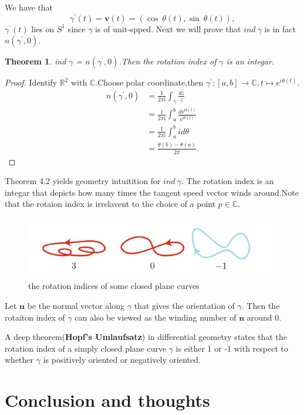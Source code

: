 \documentclass[11pt]{article}
\newtheorem{theorem}{Theorem}
\numberwithin{equation}{section} \numberwithin{theorem}{section}
\numberwithin{lemma}{section} \numberwithin{remark}{section}
\numberwithin{table}{section} \numberwithin{corollary}{section}
\numberwithin{example}{section} \numberwithin{conjecture}{section}
\numberwithin{assumption}{section}
\numberwithin{definition}{section}
\numberwithin{proposition}{section}
\begin{document}
We have that 
\begin{equation}
\gamma^{'}(t)=\mathbf{v}(t)=(\cos \ \theta(t),\sin\ \theta(t)),
\end{equation}
$\gamma^{'}(t)$ lies on $S^1$ since $\gamma$ is of unit-spped.
Next we will prove that $ind \ \gamma$ is in fact $n(\gamma^{'},0)$.
\begin{theorem}
ind  $\gamma$ = $n(\gamma^{'},0)$.Then the rotation index of $\gamma$ is an integar.
\end{theorem}
\begin{proof}
    Identify $\mathbb{R}^2$ with $\mathbb{C}$.Choose polar coordinate,then $\gamma^{'}:[a,b]\rightarrow \mathbb{C},t\mapsto e^{i\theta(t)}$.
    \begin{align*}
        n(\gamma^{'},0)&=\frac{1}{2\pi \mathrm{i}}\int_{\gamma}\frac{dz}{z}\\
        &=\frac{1}{2\pi \mathrm{i}}\int_{a}^b\frac{d\mathrm{e}^{\mathrm{i}\theta(t)}}{\mathrm{e}^{\mathrm{i}\theta(t)}}\\
        &=\frac{1}{2\pi \mathrm{i}}\int_{a}^b id\theta\\
        &=\frac{\theta(b)-\theta(a)}{2\pi}.
    \end{align*}
\end{proof} 
Theorem 4.2 yields geometry intuitition for $ind\  \gamma$. The rotation index is an integar that depicts how many times the tangent speed vector winds around.Note that the rotaion index is irrelavent to the choice of a point $p \in \mathbb{C}$.
\begin{figure}[H]
\includegraphics[width=11cm]{image/rotation index.PNG}
\centering
\caption{the rotation indices of some closed plane curves}
\end{figure}
Let $\mathbf{n}$ be the normal vector along $\gamma$ that gives the orientation of $\gamma$. Then the rotaiton index of $\gamma$ can also be viewed as the winding number of $\mathbf{n}$ around 0.

A deep theorem(\textbf{Hopf's Umlaufsatz}) in differential geometry states that the rotation index of a simply closed plane curve $\gamma$ is either 1 or -1 with respect to whether $\gamma$ is positively oriented or negatively oriented. 
\section{Conclusion and thoughts}
\end{document}
